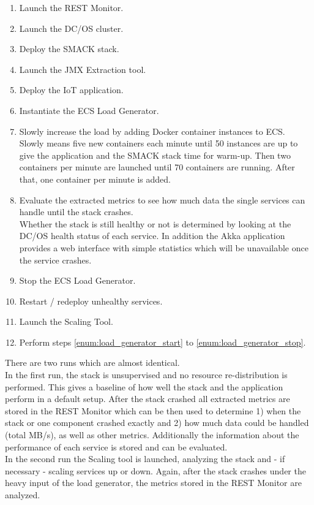 \begin{enumerate}
\item Launch the REST Monitor.
\item Launch the DC/OS cluster.
\item Deploy the SMACK stack.
\item Launch the JMX Extraction tool.
\item Deploy the IoT application.
\item Instantiate the ECS Load Generator. \label{enum:load_generator_start}
\item Slowly increase the load by adding Docker container instances to ECS.\\
      Slowly means five new containers each minute until 50 instances are up to give the application and the SMACK stack time for warm-up.
      Then two containers per minute are launched until 70 containers are running.
      After that, one container per minute is added.
\item Evaluate the extracted metrics to see how much data the single services can handle until the stack crashes.\\
      Whether the stack is still healthy or not is determined by looking at the DC/OS health status of each service.
      In addition the Akka application provides a web interface with simple statistics which will be unavailable once the service crashes.
\item Stop the ECS Load Generator. \label{enum:load_generator_stop}
\item Restart / redeploy unhealthy services.
\item Launch the Scaling Tool.
\item Perform steps \ref{enum:load_generator_start} to \ref{enum:load_generator_stop}.
\end{enumerate}

There are two runs which are almost identical.\\
In the first run, the stack is unsupervised and no resource re-distribution is performed.
This gives a baseline of how well the stack and the application perform in a default setup.
After the stack crashed all extracted metrics are stored in the REST Monitor which can be then used to determine 1) when the stack or one component crashed exactly and 2) how much data could be handled (total MB/s), as well as other metrics.
Additionally the information about the performance of each service is stored and can be evaluated.\\
In the second run the Scaling tool is launched, analyzing the stack and - if necessary - scaling services up or down.
Again, after the stack crashes under the heavy input of the load generator, the metrics stored in the REST Monitor are analyzed.\\

